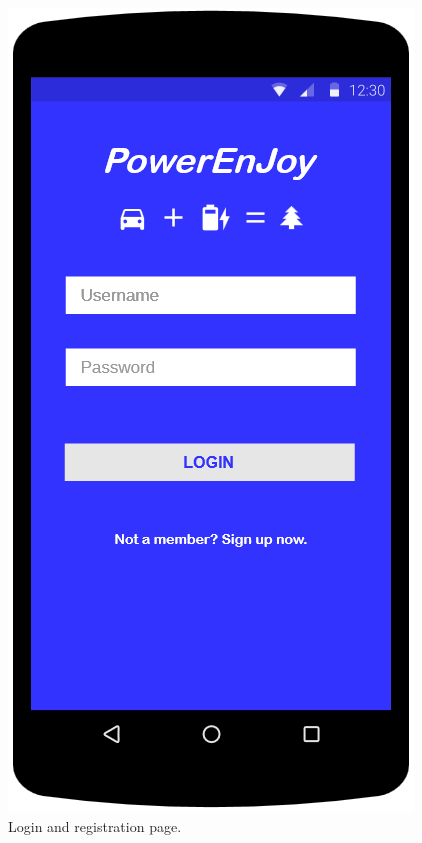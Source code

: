 \begin{figure}
	\centering
	\includegraphics[width=\textwidth,height=\dimexpr\textheight-4\baselineskip-\abovecaptionskip-\belowcaptionskip\relax,keepaspectratio]{overall_description/mockup/login.png}
	\caption{Login and registration page.}
	\label{fig:mockup_login}
\end{figure}

